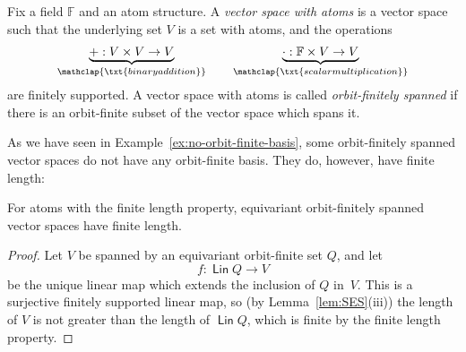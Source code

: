 \documentclass{theoretics}
\newcommand{\myunderbrace}[2]{\underbrace{#1}_{\mathclap{\txt{\scriptsize #2}}}}
\DeclareMathOperator{\lin}{\mathsf{Lin}}
\newcommand{\field}{\mathbb F}
\begin{document}
\begin{definition} Fix a field $\field$ and an atom structure.
    A \emph{vector space with atoms} is a vector space  such that the underlying set $V$ is a set with atoms, and the operations
    \begin{align*}
    \myunderbrace{+ : V \times V \to V}{binary addition} \qquad 
    \myunderbrace{\cdot : \field \times V \to V}{scalar multiplication}
    \end{align*}
    are finitely supported.  A vector space with atoms is called \emph{orbit-finitely spanned} if there is an orbit-finite subset of the vector space which spans it.
\end{definition}

As we have seen in Example~\ref{ex:no-orbit-finite-basis}, some orbit-finitely spanned vector spaces do not have any orbit-finite basis.
They do, however, have finite length:

\begin{lemma}\label{lem:finite-length-for-ofs}
For atoms with the finite length property,  equivariant orbit-finitely spanned vector spaces have finite length.
\end{lemma}
\begin{proof}
Let $V$ be spanned by an equivariant orbit-finite set $Q$, and let
\[ f \colon \lin Q \to V \]
be the unique linear map which extends the inclusion of $Q$ in~$V$.
This is a surjective finitely supported linear map, so (by Lemma~\ref{lem:SES}(iii)) the length of $V$ is not greater than the length of $\lin Q$, which is finite by the finite length property.
\end{proof}
\end{document}
